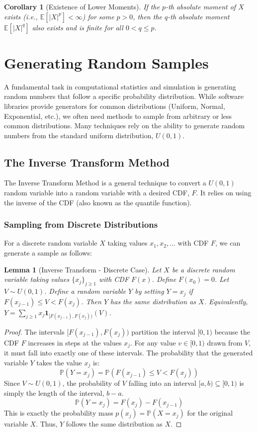 \documentclass[11pt, letterpaper]{article}
\theoremstyle{plain} %
\newtheorem{lemma}[theorem]{Lemma}
\newtheorem{corollary}[theorem]{Corollary}
\theoremstyle{definition} %
\theoremstyle{remark} %
\newcommand{\E}{\mathbb{E}} %
\newcommand{\Prob}{\mathbb{P}} %
\newcommand{\ind}[1]{\mathbf{1}_{#1}} %
\begin{document}
\begin{corollary}[Existence of Lower Moments]
If the $p$-th absolute moment of $X$ exists (i.e., $\E[|X|^p] < \infty$) for some $p > 0$, then the $q$-th absolute moment $\E[|X|^q]$ also exists and is finite for all $0 < q \le p$.
\end{corollary}

\section{Generating Random Samples}

A fundamental task in computational statistics and simulation is generating random numbers that follow a specific probability distribution. While software libraries provide generators for common distributions (Uniform, Normal, Exponential, etc.), we often need methods to sample from arbitrary or less common distributions. Many techniques rely on the ability to generate random numbers from the standard uniform distribution, $U(0, 1)$.

\subsection{The Inverse Transform Method}

The Inverse Transform Method is a general technique to convert a $U(0, 1)$ random variable into a random variable with a desired CDF, $F$. It relies on using the inverse of the CDF (also known as the quantile function).

\subsubsection{Sampling from Discrete Distributions}

For a discrete random variable $X$ taking values $x_1, x_2, \dots$ with CDF $F$, we can generate a sample as follows:

\begin{lemma}[Inverse Transform - Discrete Case] \label{lem:discrete_inv_transform}
Let $X$ be a discrete random variable taking values $\{x_j\}_{j \ge 1}$ with CDF $F(x)$. Define $F(x_0)=0$. Let $V \sim U(0, 1)$. Define a random variable $Y$ by setting $Y = x_j$ if $F(x_{j-1}) \le V < F(x_j)$. Then $Y$ has the same distribution as $X$.
Equivalently, $Y = \sum_{j \ge 1} x_j \ind{[F(x_{j-1}), F(x_j))}(V)$.
\end{lemma}

\begin{proof}
The intervals $[F(x_{j-1}), F(x_j))$ partition the interval $[0, 1)$ because the CDF $F$ increases in steps at the values $x_j$. For any value $v \in [0, 1)$ drawn from $V$, it must fall into exactly one of these intervals.
The probability that the generated variable $Y$ takes the value $x_j$ is:
\[
\Prob(Y = x_j) = \Prob(F(x_{j-1}) \le V < F(x_j))
\]
Since $V \sim U(0, 1)$, the probability of $V$ falling into an interval $[a, b) \subseteq [0, 1)$ is simply the length of the interval, $b - a$.
\[
\Prob(Y = x_j) = F(x_j) - F(x_{j-1})
\]
This is exactly the probability mass $p(x_j) = \Prob(X = x_j)$ for the original variable $X$. Thus, $Y$ follows the same distribution as $X$.
\end{proof}
\end{document}
